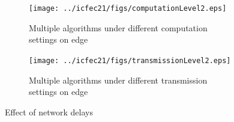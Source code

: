 




\begin{figure}[t]
	\centering
	\begin{subfigure}[b]{.45\textwidth}
		\centering
		\texttt{[image: ../icfec21/figs/computationLevel2.eps]}
		\caption{Multiple algorithms under different computation settings on edge}
		\label{fig:computingweightbar}
	\end{subfigure}
	\begin{subfigure}[b]{.45\textwidth}
		\centering
		\texttt{[image: ../icfec21/figs/transmissionLevel2.eps]}
		\caption{Multiple algorithms under different transmission settings on edge}
		\label{fig:Transmissionweightbar}
	\end{subfigure}
		\vspace{\baselineskip}
	\caption{Effect of network delays}
	\label{fig:diff-load}
\end{figure}


